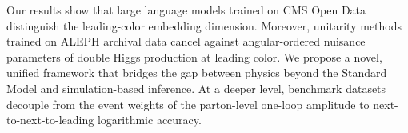 Our results show that large language models trained on CMS Open Data
distinguish the leading-color embedding dimension. Moreover, unitarity
methods trained on ALEPH archival data cancel against angular-ordered
nuisance parameters of double Higgs production at leading color. We
propose a novel, unified framework that bridges the gap between physics
beyond the Standard Model and simulation-based inference. At a deeper
level, benchmark datasets decouple from the event weights of the
parton-level one-loop amplitude to next-to-next-to-leading logarithmic
accuracy.

